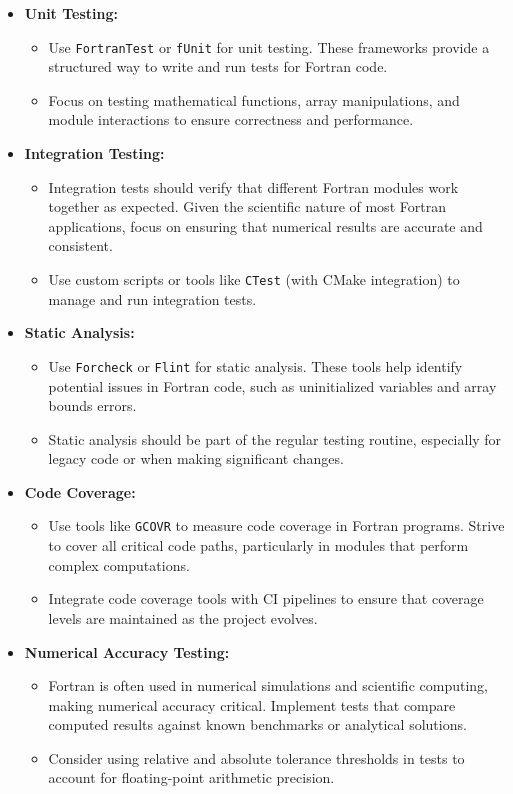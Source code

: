 \documentclass{ol-softwaremanual}
\begin{document}
\begin{itemize}
    \item \textbf{Unit Testing:}
    \begin{itemize}
        \item Use \texttt{FortranTest} or \texttt{fUnit} for unit testing. These frameworks provide a structured way to write and run tests for Fortran code.
        \item Focus on testing mathematical functions, array manipulations, and module interactions to ensure correctness and performance.
    \end{itemize}
    
    \item \textbf{Integration Testing:}
    \begin{itemize}
        \item Integration tests should verify that different Fortran modules work together as expected. Given the scientific nature of most Fortran applications, focus on ensuring that numerical results are accurate and consistent.
        \item Use custom scripts or tools like \texttt{CTest} (with CMake integration) to manage and run integration tests.
    \end{itemize}
    
    \item \textbf{Static Analysis:}
    \begin{itemize}
        \item Use \texttt{Forcheck} or \texttt{Flint} for static analysis. These tools help identify potential issues in Fortran code, such as uninitialized variables and array bounds errors.
        \item Static analysis should be part of the regular testing routine, especially for legacy code or when making significant changes.
    \end{itemize}
    
    \item \textbf{Code Coverage:}
    \begin{itemize}
        \item Use tools like \texttt{GCOVR} to measure code coverage in Fortran programs. Strive to cover all critical code paths, particularly in modules that perform complex computations.
        \item Integrate code coverage tools with CI pipelines to ensure that coverage levels are maintained as the project evolves.
    \end{itemize}
    
    \item \textbf{Numerical Accuracy Testing:}
    \begin{itemize}
        \item Fortran is often used in numerical simulations and scientific computing, making numerical accuracy critical. Implement tests that compare computed results against known benchmarks or analytical solutions.
        \item Consider using relative and absolute tolerance thresholds in tests to account for floating-point arithmetic precision.
    \end{itemize}
\end{itemize}
\end{document}
